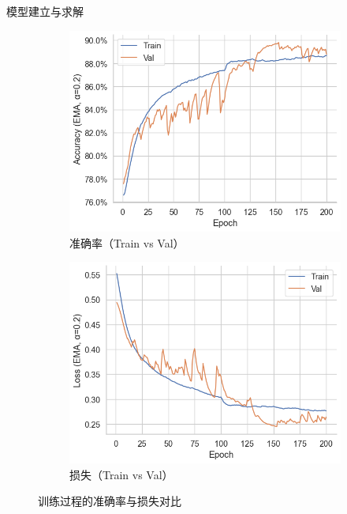 \documentclass[aspectratio=169]{beamer}
\begin{document}
\begin{frame}{模型建立与求解}
\begin{figure}[htb]
  \centering
  \begin{subfigure}{0.48\linewidth}
    \centering
    \includegraphics[width=\linewidth]{images_in_paper/acc_train_val.png}
    \caption{准确率（Train vs Val）}
    \label{fig:acc}
  \end{subfigure}\hfill
  \begin{subfigure}{0.48\linewidth}
    \centering
    \includegraphics[width=\linewidth]{images_in_paper/loss_train_val.png}
    \caption{损失（Train vs Val）}
    \label{fig:loss}
  \end{subfigure}
  \caption{训练过程的准确率与损失对比}
  \label{fig:acc-loss}
\end{figure}




\end{frame}
\end{document}
